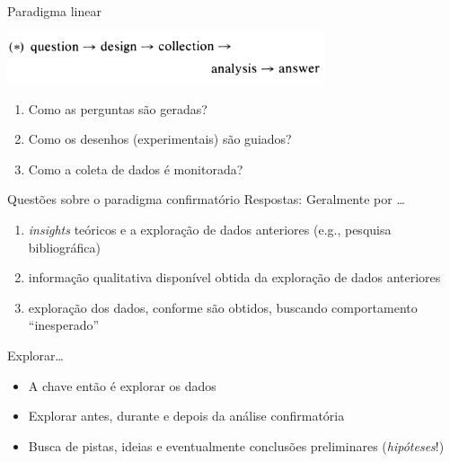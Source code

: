 \documentclass{beamer}
\begin{document}
\begin{frame}{Paradigma linear}
  \begin{center}
    \includegraphics[width=0.7\textwidth]{EDA/eda-tukey1}
  \end{center}
  \bigskip
  \begin{enumerate}
    \footnotesize
  \item Como as perguntas são geradas?
    \bigskip
  \item Como os desenhos (experimentais) são guiados?
    \bigskip
  \item Como a coleta de dados é monitorada?
  \end{enumerate}
\end{frame}

\begin{frame}{Questões sobre o paradigma confirmatório}
  \scriptsize
  Respostas: Geralmente por \ldots
  \bigskip
  \begin{enumerate}
    \footnotesize
  \item {\em insights} teóricos e a exploração de dados
    anteriores (e.g., pesquisa bibliográfica)
    \bigskip
  \item informação qualitativa disponível obtida da exploração de
    dados anteriores
    \bigskip
  \item exploração dos dados, conforme são obtidos, buscando
    comportamento ``inesperado''
  \end{enumerate}
\end{frame}

\begin{frame}{Explorar\ldots}
  \begin{itemize}
    \footnotesize
  \item A chave então é explorar os dados
    \bigskip
  \item Explorar antes, durante e depois da análise confirmatória
    \bigskip
  \item Busca de pistas, ideias e eventualmente conclusões
    preliminares ({\em hipóteses}!)
  \end{itemize}
\end{frame}
\end{document}
